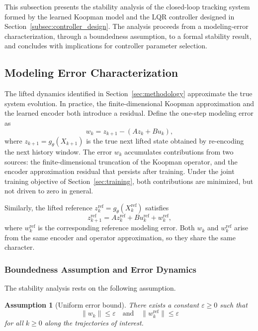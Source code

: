\documentclass[journal]{IEEEtran}
\newtheorem{assumption}{Assumption}
\begin{document}
This subsection presents the stability analysis of the closed-loop tracking system formed by the learned Koopman model and the LQR controller designed in Section~\ref{subsec:controller_design}. The analysis proceeds from a modeling-error characterization, through a boundedness assumption, to a formal stability result, and concludes with implications for controller parameter selection.

\subsection{Modeling Error Characterization}

The lifted dynamics identified in Section~\ref{sec:methodology} approximate the true system evolution. In practice, the finite-dimensional Koopman approximation and the learned encoder both introduce a residual. Define the one-step modeling error as
\begin{equation}
    w_k = z_{k+1} - (Az_k + Bu_k),
    \label{eq:modeling_error}
\end{equation}
where $z_{k+1} = g_\theta(X_{k+1})$ is the true next lifted state obtained by re-encoding the next history window. The error $w_k$ accumulates contributions from two sources: the finite-dimensional truncation of the Koopman operator, and the encoder approximation residual that persists after training. Under the joint training objective of Section~\ref{sec:training}, both contributions are minimized, but not driven to zero in general.

Similarly, the lifted reference $z_k^{\mathrm{ref}} = g_\theta(X_k^{\mathrm{ref}})$ satisfies
\begin{equation}
    z_{k+1}^{\mathrm{ref}} = Az_k^{\mathrm{ref}} + Bu_k^{\mathrm{ref}} + w_k^{\mathrm{ref}},
    \label{eq:ref_error}
\end{equation}
where $w_k^{\mathrm{ref}}$ is the corresponding reference modeling error. Both $w_k$ and $w_k^{\mathrm{ref}}$ arise from the same encoder and operator approximation, so they share the same character.

\subsubsection{Boundedness Assumption and Error Dynamics}

The stability analysis rests on the following assumption.

\begin{assumption}[Uniform error bound]
\label{assump:bound}
There exists a constant $\varepsilon \geq 0$ such that
\begin{equation}
    \|w_k\| \leq \varepsilon \quad \text{and} \quad \|w_k^{\mathrm{ref}}\| \leq \varepsilon
    \label{eq:error_bound}
\end{equation}
for all $k \geq 0$ along the trajectories of interest.
\end{assumption}
\end{document}
